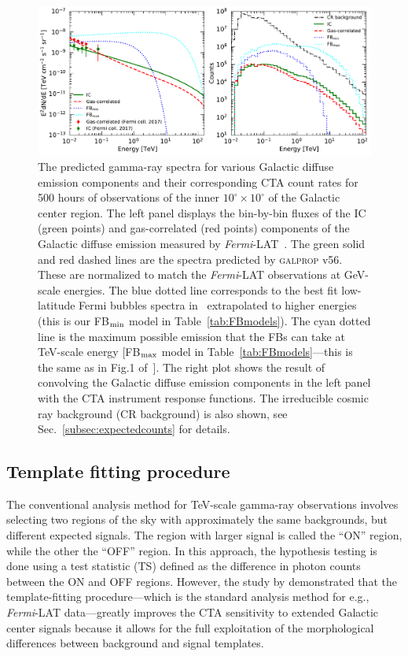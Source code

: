 \documentclass[doublespace,nopageskip]{VTthesis} %
\begin{document}
\begin{figure}[htb]
    \centering
    \includegraphics[width=\textwidth]{Figures/CTA/spectra-and-counts.pdf}
    \caption{The predicted gamma-ray spectra for various Galactic diffuse emission components and their corresponding CTA count rates for 500 hours of observations of the inner $10^\circ \times 10^\circ$ of the Galactic center region. The left panel displays the bin-by-bin fluxes of the IC (green points) and gas-correlated (red points) components of the Galactic diffuse emission measured by \textit{Fermi}-LAT~\citep{2017ApJ...840...43A}. The green solid and red dashed lines are the spectra predicted by \textsc{galprop} v56. These are normalized to match the \textit{Fermi}-LAT observations at GeV-scale energies. The blue dotted line corresponds to the best fit low-latitude Fermi bubbles spectra in~\citep{2017ApJ...840...43A} extrapolated to higher energies (this is our FB$_{\rm min}$ model in Table~\ref{tab:FBmodels}). The cyan dotted line is the maximum possible emission that the FBs can take at TeV-scale energy [FB$_{\rm max}$ model in Table~\ref{tab:FBmodels}---this is the same as in Fig.1 of~\citet{2021PhRvD.103b3011R}]. The right plot shows the result of convolving the Galactic diffuse emission components in the left panel with the CTA instrument response functions. The irreducible cosmic ray background (CR background) is also shown, see Sec.~\ref{subsec:expectedcounts} for details.}
    \label{fig:counts_spectra}
\end{figure}

\subsection{Template fitting procedure}
\label{sub:templatefitting}

The conventional analysis method for TeV-scale gamma-ray observations involves selecting two regions of the sky with approximately the same backgrounds, 
but different expected signals. The region with larger signal is called the ``ON'' region, while the other the ``OFF'' region. In this approach, the hypothesis testing is done using a test statistic (TS) defined as the difference in photon counts between the ON and OFF regions. However, the study by \cite{2015JCAP...03..055S} demonstrated that the template-fitting procedure---which is the standard analysis method for e.g., \textit{Fermi}-LAT data---greatly improves the CTA sensitivity to extended Galactic center signals because it allows for the full exploitation of the morphological differences between background and signal templates. 
\end{document}

